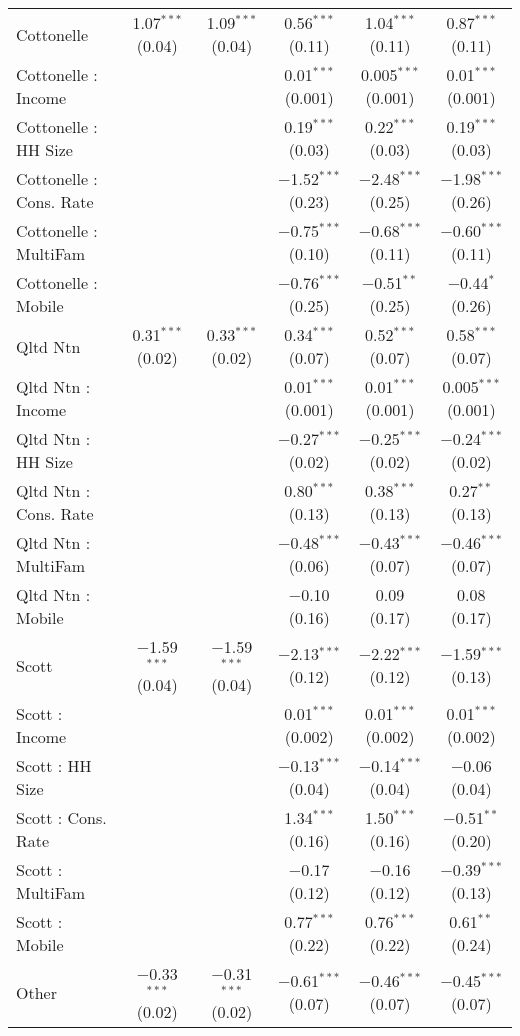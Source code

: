 \begin{table}[!htbp]
\begin{tabular}{@{\extracolsep{5pt}}lccccc}
  Cottonelle & 1.07$^{***}$ (0.04) & 1.09$^{***}$ (0.04) & 0.56$^{***}$ (0.11) & 1.04$^{***}$ (0.11) & 0.87$^{***}$ (0.11) \\ 
  Cottonelle : Income &  &  & 0.01$^{***}$ (0.001) & 0.005$^{***}$ (0.001) & 0.01$^{***}$ (0.001) \\ 
  Cottonelle : HH Size &  &  & 0.19$^{***}$ (0.03) & 0.22$^{***}$ (0.03) & 0.19$^{***}$ (0.03) \\ 
  Cottonelle : Cons. Rate &  &  & $-$1.52$^{***}$ (0.23) & $-$2.48$^{***}$ (0.25) & $-$1.98$^{***}$ (0.26) \\ 
  Cottonelle : MultiFam &  &  & $-$0.75$^{***}$ (0.10) & $-$0.68$^{***}$ (0.11) & $-$0.60$^{***}$ (0.11) \\ 
  Cottonelle : Mobile &  &  & $-$0.76$^{***}$ (0.25) & $-$0.51$^{**}$ (0.25) & $-$0.44$^{*}$ (0.26) \\ 
  Qltd Ntn & 0.31$^{***}$ (0.02) & 0.33$^{***}$ (0.02) & 0.34$^{***}$ (0.07) & 0.52$^{***}$ (0.07) & 0.58$^{***}$ (0.07) \\ 
  Qltd Ntn : Income &  &  & 0.01$^{***}$ (0.001) & 0.01$^{***}$ (0.001) & 0.005$^{***}$ (0.001) \\ 
  Qltd Ntn : HH Size &  &  & $-$0.27$^{***}$ (0.02) & $-$0.25$^{***}$ (0.02) & $-$0.24$^{***}$ (0.02) \\ 
  Qltd Ntn : Cons. Rate &  &  & 0.80$^{***}$ (0.13) & 0.38$^{***}$ (0.13) & 0.27$^{**}$ (0.13) \\ 
  Qltd Ntn : MultiFam &  &  & $-$0.48$^{***}$ (0.06) & $-$0.43$^{***}$ (0.07) & $-$0.46$^{***}$ (0.07) \\ 
  Qltd Ntn : Mobile &  &  & $-$0.10 (0.16) & 0.09 (0.17) & 0.08 (0.17) \\ 
  Scott & $-$1.59$^{***}$ (0.04) & $-$1.59$^{***}$ (0.04) & $-$2.13$^{***}$ (0.12) & $-$2.22$^{***}$ (0.12) & $-$1.59$^{***}$ (0.13) \\ 
  Scott : Income &  &  & 0.01$^{***}$ (0.002) & 0.01$^{***}$ (0.002) & 0.01$^{***}$ (0.002) \\ 
  Scott : HH Size &  &  & $-$0.13$^{***}$ (0.04) & $-$0.14$^{***}$ (0.04) & $-$0.06 (0.04) \\ 
  Scott : Cons. Rate &  &  & 1.34$^{***}$ (0.16) & 1.50$^{***}$ (0.16) & $-$0.51$^{**}$ (0.20) \\ 
  Scott : MultiFam &  &  & $-$0.17 (0.12) & $-$0.16 (0.12) & $-$0.39$^{***}$ (0.13) \\ 
  Scott : Mobile &  &  & 0.77$^{***}$ (0.22) & 0.76$^{***}$ (0.22) & 0.61$^{**}$ (0.24) \\ 
  Other & $-$0.33$^{***}$ (0.02) & $-$0.31$^{***}$ (0.02) & $-$0.61$^{***}$ (0.07) & $-$0.46$^{***}$ (0.07) & $-$0.45$^{***}$ (0.07) \\ 

\end{tabular}
\end{table}
